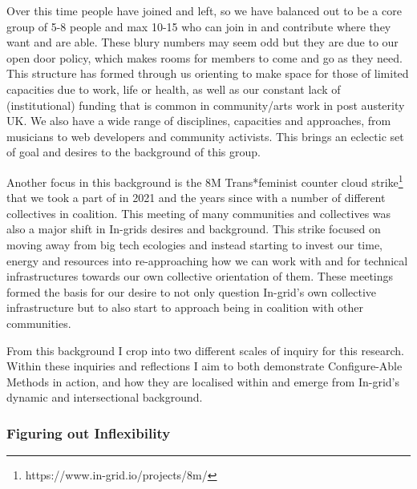 Over this time people have joined and left, so we have balanced out to
be a core group of 5-8 people and max 10-15 who can join in and
contribute where they want and are able. These blury numbers may seem
odd but they are due to our open door policy, which makes rooms for
members to come and go as they need. This structure has formed through
us orienting to make space for those of limited capacities due to work,
life or health, as well as our constant lack of (institutional) funding
that is common in community/arts work in post austerity UK. We also have
a wide range of disciplines, capacities and approaches, from musicians
to web developers and community activists. This brings an eclectic set
of goal and desires to the background of this group.

Another focus in this background is the 8M Trans*feminist counter cloud
strike\footnote{https://www.in-grid.io/projects/8m/} that we took a part
of in 2021 and the years since with a number of different collectives in
coalition. This meeting of many communities and collectives was also a
major shift in In-grids desires and background. This strike focused on
moving away from big tech ecologies and instead starting to invest our
time, energy and resources into re-approaching how we can work with and
for technical infrastructures towards our own collective orientation of
them. These meetings formed the basis for our desire to not only
question In-grid's own collective infrastructure but to also start to
approach being in coalition with other communities.

From this background I crop into two different scales of inquiry for
this research. Within these inquiries and reflections I aim to both
demonstrate Configure-Able Methods in action, and how they are localised
within and emerge from In-grid's dynamic and intersectional background.

\hypertarget{figuring-out-inflexibility}{%
\subsubsection[Figuring out
Inflexibility]{\texorpdfstring{\protect\hypertarget{anchor}{}{}Figuring
out
Inflexibility}{Figuring out Inflexibility}}\label{figuring-out-inflexibility}}

